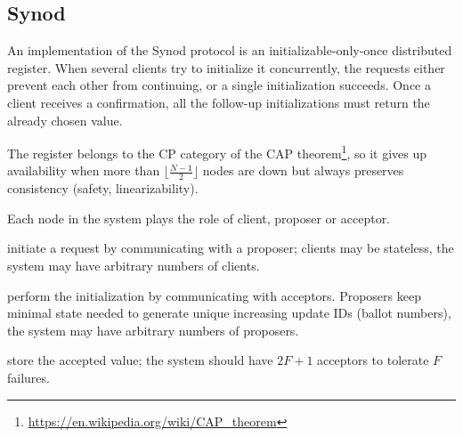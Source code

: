 \documentclass[12pt]{article}
\theoremstyle{definition}
\begin{document}
\subsection{Synod}

An implementation of the Synod protocol is an initializable-only-once distributed register. When several clients try to initialize it concurrently, the requests either prevent each other from continuing, or a single initialization succeeds. Once a client receives a confirmation, all the follow-up initializations must return the already chosen value.

The register belongs to the CP category of the CAP theorem\footnote{\href{https://en.wikipedia.org/wiki/CAP\_theorem}{https://en.wikipedia.org/wiki/CAP\_theorem}}, so it gives up availability when more than $\lfloor \frac{N-1}2 \rfloor$ nodes are down but always preserves consistency (safety, linearizability).

Each node in the system plays the role of client, proposer or acceptor.

\begin{description}[align=left]
  \item [Clients] initiate a request by communicating with a proposer; clients may be stateless, the system may have arbitrary numbers of clients.
  \item [Proposers] perform the initialization by communicating with acceptors. Proposers keep minimal state needed to generate unique increasing update IDs (ballot numbers), the system may have arbitrary numbers of proposers.
  \item [Acceptors] store the accepted value; the system should have $2F+1$ acceptors to tolerate $F$ failures.
\end{description}
\end{document}
